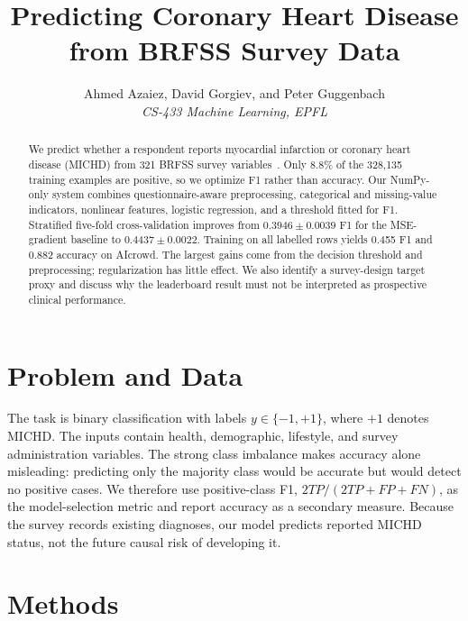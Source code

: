 \documentclass[10pt,conference,compsocconf]{IEEEtran}
\begin{document}
\title{Predicting Coronary Heart Disease from BRFSS Survey Data}

\author{
  Ahmed Azaiez, David Gorgiev, and Peter Guggenbach\\
  \textit{CS-433 Machine Learning, EPFL}
}

\maketitle

\begin{abstract}
We predict whether a respondent reports myocardial infarction or coronary
heart disease (MICHD) from 321 BRFSS survey variables~\cite{cdc2015data}.  Only 8.8\% of the
328,135 training examples are positive, so we optimize F1 rather than
accuracy.  Our NumPy-only system combines questionnaire-aware preprocessing,
categorical and missing-value indicators, nonlinear features, logistic
regression, and a threshold fitted for F1.  Stratified five-fold
cross-validation improves from $0.3946\pm0.0039$ F1 for the MSE-gradient
baseline to $0.4437\pm0.0022$.  Training on all labelled rows yields 0.455 F1
and 0.882 accuracy on AIcrowd.  The largest gains come from the decision
threshold and preprocessing; regularization has little effect.  We also
identify a survey-design target proxy and discuss why the leaderboard result
must not be interpreted as prospective clinical performance.
\end{abstract}

\section{Problem and Data}

The task is binary classification with labels $y\in\{-1,+1\}$, where $+1$
denotes MICHD.  The inputs contain health, demographic, lifestyle, and survey
administration variables.  The strong class imbalance makes accuracy alone
misleading: predicting only the majority class would be accurate but would
detect no positive cases.  We therefore use positive-class F1,
$2TP/(2TP+FP+FN)$, as the model-selection metric and report accuracy as a
secondary measure.  Because the survey records existing diagnoses, our model
predicts reported MICHD status, not the future causal risk of developing it.

\section{Methods}
\end{document}
